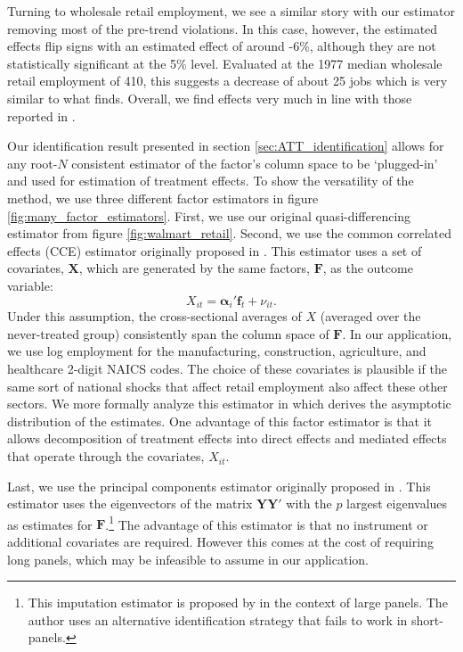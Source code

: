 \documentclass[12pt]{article}
\begin{document}
Turning to wholesale retail employment, we see a similar story with our estimator removing most of the pre-trend violations. In this case, however, the estimated effects flip signs with an estimated effect of around -6\%, although they are not statistically significant at the 5\% level. Evaluated at the 1977 median wholesale retail employment of 410, this suggests a decrease of about 25 jobs which is very similar to what \citet{basker2005job} finds. Overall, we find effects very much in line with those reported in \citet{basker2005job}.

Our identification result presented in section \ref{sec:ATT_identification} allows for any root-$N$ consistent estimator of the factor's column space to be `plugged-in' and used for estimation of treatment effects. To show the versatility of the method, we use three different factor estimators in figure \ref{fig:many_factor_estimators}. First, we use our original quasi-differencing estimator from figure \ref{fig:walmart_retail}. Second, we use the common correlated effects (CCE) estimator originally proposed in \citet{Pesaran_2006}. This estimator uses a set of covariates, $\bm X$, which are generated by the same factors, $\bm F$, as the outcome variable:
\begin{equation}
  X_{it} = \bm\alpha_i' \bm f_t + \nu_{it}.
\end{equation}
Under this assumption, the cross-sectional averages of $X$ (averaged over the never-treated group) consistently span the column space of $\bm F$.  In our application, we use log employment for the manufacturing, construction, agriculture, and healthcare 2-digit NAICS codes. The choice of these covariates is plausible if the same sort of national shocks that affect retail employment also affect these other sectors. We more formally analyze this estimator in \citet{Brown_Butts_Westerlund_2023} which derives the asymptotic distribution of the estimates. One advantage of this factor estimator is that it allows decomposition of treatment effects into direct effects and mediated effects that operate through the covariates, $X_{it}$.

Last, we use the principal components estimator originally proposed in \citet{Bai_2009}. This estimator uses the eigenvectors  of the matrix $\bm Y \bm Y'$ with the $p$ largest eigenvalues as estimates for $\bm F$.\footnote{This imputation estimator is proposed by \citet{Xu_2017} in the context of large panels. The author uses an alternative identification strategy that fails to work in short-panels.} The advantage of this estimator is that no instrument or additional covariates are required. However this comes at the cost of requiring long panels, which may be infeasible to assume in our application.
\end{document}
